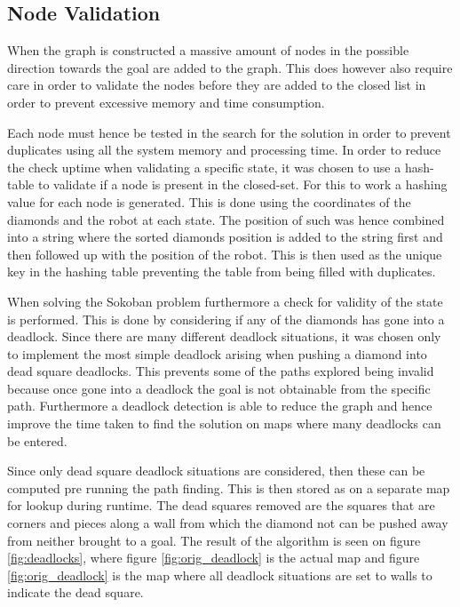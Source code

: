 \subsection{Node Validation}
When the graph is constructed a massive amount of nodes in the possible direction towards the goal are added to the graph.
This does however also require care in order to validate the nodes before they are added to the closed list in order to prevent excessive memory and time consumption.

Each node must hence be tested in the search for the solution in order to prevent duplicates using all the system memory and processing time.
In order to reduce the check uptime when validating a specific state, it was chosen to use a hash-table to validate if a node is present in the closed-set.
For this to work a hashing value for each node is generated.
This is done using the coordinates of the diamonds and the robot at each state.
The position of such was hence combined into a string where the sorted diamonds position is added to the string first and then followed up with the position of the robot.
This is then used as the unique key in the hashing table preventing the table from being filled with duplicates.

When solving the Sokoban problem furthermore a check for validity of the state is performed.
This is done by considering if any of the diamonds has gone into a deadlock.
Since there are many different deadlock situations, it was chosen only to implement the most simple deadlock arising when pushing a diamond into dead square deadlocks.
This prevents some of the paths explored being invalid because once gone into a deadlock the goal is not obtainable from the specific path.
Furthermore a deadlock detection is able to reduce the graph and hence improve the time taken to find the solution on maps where many deadlocks can be entered.

Since only dead square deadlock situations are considered, then these can be computed pre running the path finding.
This is then stored as on a separate map for lookup during runtime.
The dead squares removed are the squares that are corners and pieces along a wall from which the diamond not can be pushed away from neither brought to a goal.
The result of the algorithm is seen on figure \ref{fig:deadlocks}, where figure \ref{fig:orig_deadlock} is the actual map and figure \ref{fig:orig_deadlock} is the map where all deadlock situations are set to walls to indicate the dead square.


